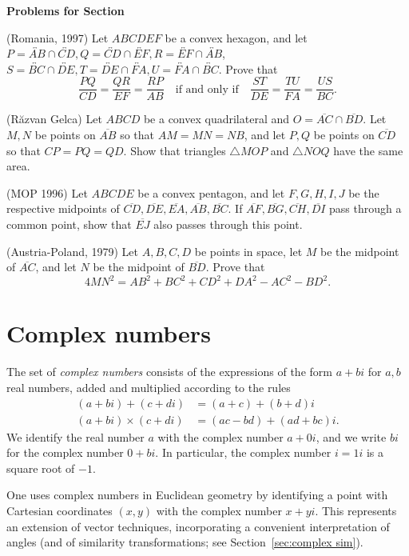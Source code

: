 \documentclass[12pt]{book}
\newcounter{exc}
\numberwithin{exc}{section}
\numberwithin{figure}{section}
\newenvironment{exer}{\vspace{0.1in}
\noindent \textbf{Problems for Section~\thesection} \vspace{0.1in}
\begin{list}{\arabic{exc}.}{\usecounter{exc}}}{\end{list}}
\numberwithin{equation}{theorem}
\def\ii{\item}
\def\line#1{\overleftrightarrow{#1}}
\def\seg#1{\overline{#1}}
\begin{document}
\begin{exer}
\ii (Romania, 1997)
Let $ABCDEF$ be a convex hexagon, and let $P = \line{AB} \cap \line{CD},
 Q = \line{CD} 
\cap \line{EF}, R = \line{EF} \cap \line{AB}$, $S = \line{BC} \cap \line{DE}, T = \line{DE} \cap \line{FA}, U = \line{FA} \cap 
\line{BC}$. Prove that
\[
\frac{PQ}{CD} = \frac{QR}{EF} = \frac{RP}{AB}
\quad \mbox{if and only if} \quad \frac{ST}{DE} = \frac{TU}{FA} = \frac{US}{BC}.
\]
\ii (R\u{a}zvan Gelca) 
Let $ABCD$ be a convex quadrilateral and $O = \seg{AC} \cap \seg{BD}$. Let $M, N$
be points on $\seg{AB}$ so that $AM = MN = NB$, and let $P, Q$ be points on
$\seg{CD}$ so that $CP = PQ = QD$. Show that triangles $\triangle
MOP$ and $\triangle NOQ$ have
the same area.
\ii (MOP 1996)
Let $ABCDE$ be a convex pentagon, and let $F,G,H,I,J$ be the 
respective midpoints 
of $\seg{CD}, \seg{DE}, \seg{EA}, \seg{AB}, \seg{BC}$. If 
$\seg{AF}, \seg{BG}, \seg{CH}, \seg{DI}$ pass through a common 
point, show that $\seg{EJ}$ also passes through this point.
\ii (Austria-Poland, 1979)
Let $A,B,C,D$ be points in space, let $M$ be
the midpoint of $\seg{AC}$, and let $N$ be 
the midpoint of $\seg{BD}$. Prove that
\[
4MN^{2} = AB^{2} + BC^{2} +CD^{2} + DA^{2} -AC^{2} - BD^{2}.
\]
\end{exer}

\section{Complex numbers}
\label{sec:cplx}

The set of \emph{complex numbers} 
consists of the expressions of the form $a+bi$
for $a,b$ real numbers, added and multiplied according to the rules
\begin{align*}
(a+bi) + (c+di) &= (a+c) + (b+d)i \\
(a+bi) \times(c+di) &= (ac-bd) + (ad+bc)i.
\end{align*}
We identify the real number $a$ with the complex number $a+0i$, and we write $bi$ for the complex number $0+bi$. In particular, the complex number $i = 1i$ is a square root of $-1$.

One uses complex numbers in Euclidean geometry by identifying a point with Cartesian coordinates $(x,y)$ with the complex number $x+yi$. This represents an extension of vector techniques, incorporating a convenient interpretation of
angles (and of similarity transformations; see Section~\ref{sec:complex sim}).
\end{document}
